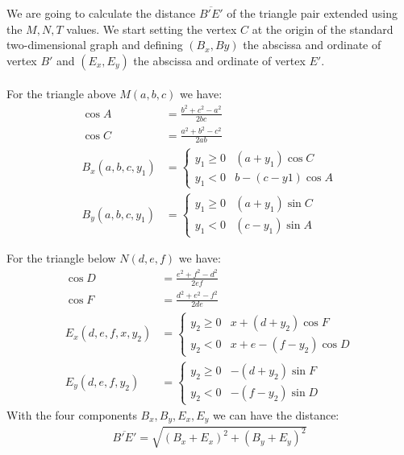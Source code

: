 \documentclass[11pt]{article}
\begin{document}
We are going to calculate the distance $\overline{B'E'}$ of the triangle pair extended using the $M,N,T$ values. We start setting the vertex $C$ at the origin of the standard two-dimensional graph and defining $(B_x, By)$ the abscissa and ordinate of vertex $B'$ and
$(E_x, E_y)$ the abscissa and ordinate of vertex $E'$.
\\\\
For the triangle above $M(a,b,c)$ we have:
\begin{align}
\cos{A} &= \frac{b^2 + c^2 - a^2}{2bc}\\
\cos{C} &= \frac{a^2 + b^2 - c^2}{2ab}\\
B_x(a,b,c,y_1) &= \left \{ \begin{array}{rl}
  y_1 \geq 0 & (a+y_1)\cos{C}\\
  y_1 < 0    & b - (c-y1)\cos{A}
 \end{array}\right. \\
B_y(a,b,c,y_1) &= \left \{ \begin{array}{rl}
 y_1 \geq 0 & (a+y_1)\sin{C}\\
 y_1 < 0    & (c-y_1)\sin{A}
 \end{array}\right. 
\end{align}

For the triangle below $N(d,e,f)$ we have:
\begin{align}
\cos{D} &= \frac{e^2 + f^2 - d^2}{2ef}\\
\cos{F} &= \frac{d^2 + e^2 - f^2}{2de}\\
E_x(d,e,f,x,y_2) &= \left \{ \begin{array}{rl}
 y_2 \geq 0 & x + (d+y_2)\cos{F}\\
 y_2 < 0    & x + e - (f-y_2)\cos{D} 
 \end{array}\right. \\
E_y(d,e,f,y_2) &= \left \{ \begin{array}{rl}
 y_2 \geq 0 & -(d+y_2)\sin{F} \\
 y_2 < 0    & -(f-y_2)\sin{D}
 \end{array}\right. 
\end{align}
With the four components $B_x, B_y, E_x, E_y$ we can have the distance:
\begin{align}
\overline{B'E'} = \sqrt{(B_x + E_x)^2 + (B_y + E_y)^2}
\end{align}
\end{document}
